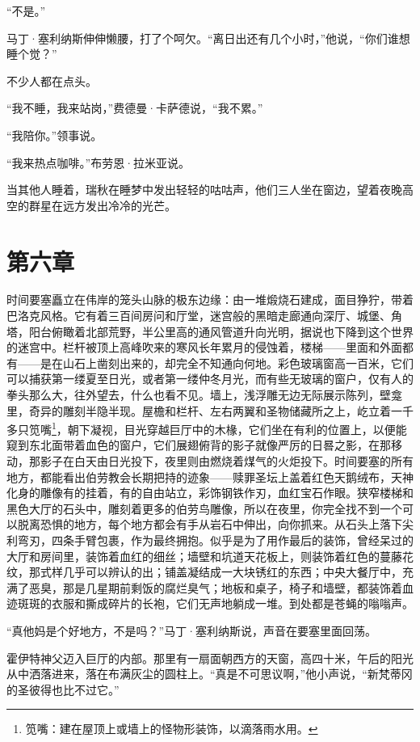 \documentclass[AutoFakeBold=true]{book}
\begin{document}
``不是。''

马丁·塞利纳斯伸伸懒腰，打了个呵欠。``离日出还有几个小时，''他说，``你们谁想睡个觉？''

不少人都在点头。

``我不睡，我来站岗，''费德曼·卡萨德说，``我不累。''

``我陪你。''领事说。

``我来热点咖啡。''布劳恩·拉米亚说。

当其他人睡着，瑞秋在睡梦中发出轻轻的咕咕声，他们三人坐在窗边，望着夜晚高空的群星在远方发出冷冷的光芒。

\chapter{第六章}

时间要塞矗立在伟岸的笼头山脉的极东边缘：由一堆煅烧石建成，面目狰狞，带着巴洛克风格。它有着三百间房问和厅堂，迷宫般的黑暗走廊通向深厅、城堡、角塔，阳台俯瞰着北部荒野，半公里高的通风管道升向光明，据说也下降到这个世界的迷宫中。栏杆被顶上高峰吹来的寒风长年累月的侵蚀着，楼梯——里面和外面都有——是在山石上凿刻出来的，却完全不知通向何地。彩色玻璃窗高一百米，它们可以捕获第一缕夏至日光，或者第一缕仲冬月光，而有些无玻璃的窗户，仅有人的拳头那么大，往外望去，什么也看不见。墙上，浅浮雕无边无际展示陈列，壁龛里，奇异的雕刻半隐半现。屋檐和栏杆、左右两翼和圣物储藏所之上，屹立着一千多只笕嘴\footnote{笕嘴：建在屋顶上或墙上的怪物形装饰，以滴落雨水用。}，朝下凝视，目光穿越巨厅中的木椽，它们坐在有利的位置上，以便能窥到东北面带着血色的窗户，它们展翅俯背的影子就像严厉的日晷之影，在那移动，那影子在白天由日光投下，夜里则由燃烧着煤气的火炬投下。时间要塞的所有地方，都能看出伯劳教会长期把持的迹象——赎罪圣坛上盖着红色天鹅绒布，天神化身的雕像有的挂着，有的自由站立，彩饰钢铁作刃，血红宝石作眼。狭窄楼梯和黑色大厅的石头中，雕刻着更多的伯劳鸟雕像，所以在夜里，你完全找不到一个可以脱离恐惧的地方，每个地方都会有手从岩石中伸出，向你抓来。从石头上落下尖利弯刃，四条手臂包裹，作为最终拥抱。似乎是为了用作最后的装饰，曾经呆过的大厅和房间里，装饰着血红的细丝；墙壁和坑道天花板上，则装饰着红色的蔓藤花纹，那式样几乎可以辨认的出；铺盖凝结成一大块锈红的东西；中央大餐厅中，充满了恶臭，那是几星期前剩饭的腐烂臭气；地板和桌子，椅子和墙壁，都装饰着血迹斑斑的衣服和撕成碎片的长袍，它们无声地躺成一堆。到处都是苍蝇的嗡嗡声。

``真他妈是个好地方，不是吗？''马丁·塞利纳斯说，声音在要塞里面回荡。

霍伊特神父迈入巨厅的内部。那里有一扇面朝西方的天窗，高四十米，午后的阳光从中洒落进来，落在布满灰尘的圆柱上。``真是不可思议啊，''他小声说，``新梵蒂冈的圣彼得也比不过它。''
\end{document}
